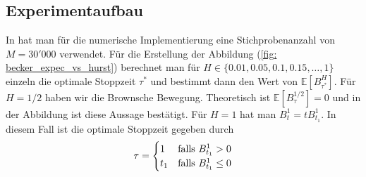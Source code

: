 \documentclass[12pt,titlepage,headsepline]{article}
\begin{document}
      \subsection{Experimentaufbau}
        In \cite{becker_deep_2019} hat man für die numerische Implementierung eine Stichprobenanzahl von $M = 30'000$ verwendet. Für die Erstellung der Abbildung (\ref{fig: becker_expec_vs_hurst}) berechnet man für $H \in \{0.01,0.05,0.1,0.15,\ldots,1\}$ einzeln die optimale Stoppzeit $\tau^*$ und bestimmt dann den Wert von $\mathbb{E}[B_{\tau^*}^H]$. Für
        $H=1/2$ haben wir die Brownsche Bewegung. Theoretisch ist $\mathbb{E}[B^{1/2}_{\tau}] = 0$ und in der Abbildung ist diese Aussage bestätigt. Für $H = 1$ hat man $B_t^1 = tB_{t_1}^1$. In diesem Fall ist die optimale Stoppzeit gegeben durch
        \begin{align*}
          \tau =
          \begin{cases}
            1 & \textup{falls } B_{t_1}^1 > 0 \\
            t_1 & \textup{falls } B_{t_1}^1 \leq 0
          \end{cases}
        \end{align*}
\end{document}
